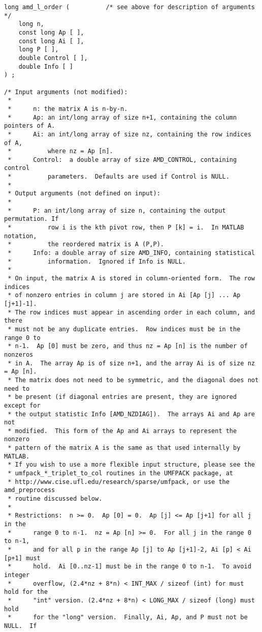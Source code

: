 \documentclass[11pt]{article}
\begin{document}
{\begin{verbatim}
long amd_l_order (          /* see above for description of arguments */
    long n,
    const long Ap [ ],
    const long Ai [ ],
    long P [ ],
    double Control [ ],
    double Info [ ]
) ;

/* Input arguments (not modified):
 *
 *      n: the matrix A is n-by-n.
 *      Ap: an int/long array of size n+1, containing the column pointers of A.
 *      Ai: an int/long array of size nz, containing the row indices of A,
 *          where nz = Ap [n].
 *      Control:  a double array of size AMD_CONTROL, containing control
 *          parameters.  Defaults are used if Control is NULL.
 *
 * Output arguments (not defined on input):
 *
 *      P: an int/long array of size n, containing the output permutation. If
 *          row i is the kth pivot row, then P [k] = i.  In MATLAB notation,
 *          the reordered matrix is A (P,P).
 *      Info: a double array of size AMD_INFO, containing statistical
 *          information.  Ignored if Info is NULL.
 *
 * On input, the matrix A is stored in column-oriented form.  The row indices
 * of nonzero entries in column j are stored in Ai [Ap [j] ... Ap [j+1]-1].
 * The row indices must appear in ascending order in each column, and there
 * must not be any duplicate entries.  Row indices must be in the range 0 to
 * n-1.  Ap [0] must be zero, and thus nz = Ap [n] is the number of nonzeros
 * in A.  The array Ap is of size n+1, and the array Ai is of size nz = Ap [n].
 * The matrix does not need to be symmetric, and the diagonal does not need to
 * be present (if diagonal entries are present, they are ignored except for
 * the output statistic Info [AMD_NZDIAG]).  The arrays Ai and Ap are not
 * modified.  This form of the Ap and Ai arrays to represent the nonzero
 * pattern of the matrix A is the same as that used internally by MATLAB.
 * If you wish to use a more flexible input structure, please see the
 * umfpack_*_triplet_to_col routines in the UMFPACK package, at
 * http://www.cise.ufl.edu/research/sparse/umfpack, or use the amd_preprocess
 * routine discussed below.
 *
 * Restrictions:  n >= 0.  Ap [0] = 0.  Ap [j] <= Ap [j+1] for all j in the
 *      range 0 to n-1.  nz = Ap [n] >= 0.  For all j in the range 0 to n-1,
 *      and for all p in the range Ap [j] to Ap [j+1]-2, Ai [p] < Ai [p+1] must
 *      hold.  Ai [0..nz-1] must be in the range 0 to n-1.  To avoid integer
 *      overflow, (2.4*nz + 8*n) < INT_MAX / sizeof (int) for must hold for the
 *      "int" version. (2.4*nz + 8*n) < LONG_MAX / sizeof (long) must hold
 *      for the "long" version.  Finally, Ai, Ap, and P must not be NULL.  If

\end{verbatim}}
\end{document}
